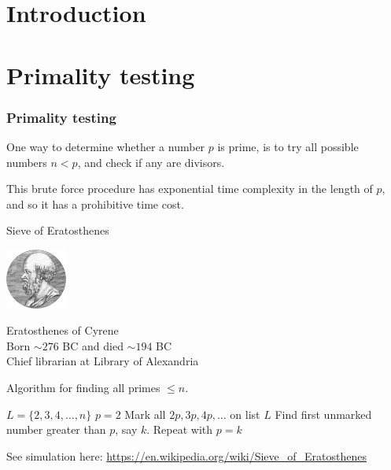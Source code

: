 
\newcommand{\mytitle}{Randomized}
\newcommand{\mychpnr}{6}


\section{Introduction}


\section{Primality testing}

\begin{frame}
\frametitle{Primality testing}

One way to determine whether a number $p$ is prime, is to try all
possible numbers $n<p$, and check if any are divisors.

This brute force procedure has exponential time complexity
in the length of $p$, and so it has a prohibitive time cost.  
\end{frame}

\begin{frame}
{Sieve of Eratosthenes}

\begin{minipage}{2cm}
\includegraphics[width=2cm]{Figures/Eratosthene.png}
\end{minipage}
\begin{minipage}{6cm}
Eratosthenes of Cyrene \\
Born $\sim 276$ BC and died $\sim 194$ BC \\
Chief librarian at Library of Alexandria
\end{minipage}

Algorithm for finding all primes $\le n$.
\begin{algorithmic}[1] 
  \STATE  $L=\{2,3,4,\ldots,n\}$
  \STATE  $p=2$
	\STATE  Mark all $2p,3p,4p,\ldots$ on list $L$ 
	\STATE  Find first unmarked number greater than $p$, say $k$.
	\STATE  Repeat with $p=k$
\end{algorithmic}

See simulation here:
\url{https://en.wikipedia.org/wiki/Sieve_of_Eratosthenes}
\end{frame}

